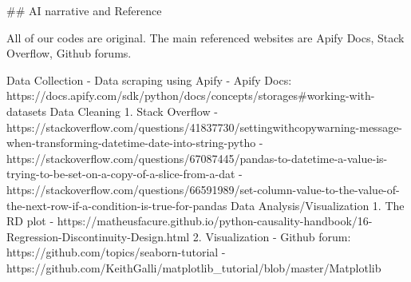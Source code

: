 ## AI narrative and Reference

All of our codes are original. The main referenced websites are Apify Docs, Stack Overflow, Github forums.

Data Collection
- Data scraping using Apify  - Apify Docs: https://docs.apify.com/sdk/python/docs/concepts/storages#working-with-datasets
Data Cleaning
1. Stack Overflow
	- https://stackoverflow.com/questions/41837730/settingwithcopywarning-message-when-transforming-datetime-date-into-string-pytho
	- https://stackoverflow.com/questions/67087445/pandas-to-datetime-a-value-is-trying-to-be-set-on-a-copy-of-a-slice-from-a-dat
	- https://stackoverflow.com/questions/66591989/set-column-value-to-the-value-of-the-next-row-if-a-condition-is-true-for-pandas
Data Analysis/Visualization
1. The RD plot - https://matheusfacure.github.io/python-causality-handbook/16-Regression-Discontinuity-Design.html
2. Visualization
	- Github forum: https://github.com/topics/seaborn-tutorial
 	- https://github.com/KeithGalli/matplotlib_tutorial/blob/master/Matplotlib%
